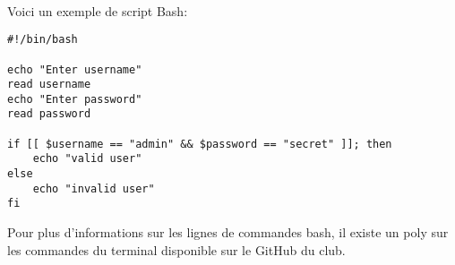 \paragraph{} Voici un exemple de script Bash:

\begin{verbatim}
#!/bin/bash

echo "Enter username"
read username
echo "Enter password"
read password

if [[ $username == "admin" && $password == "secret" ]]; then
	echo "valid user"
else
	echo "invalid user"
fi
\end{verbatim}


Pour plus d'informations sur les lignes de commandes bash, il existe un poly sur les commandes du terminal disponible sur le GitHub du club.
